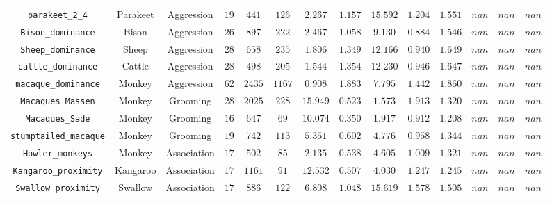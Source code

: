 \documentclass[10pt]{article}
\begin{document}
\begin{landscape}
\begin{table}[t]
\begin{tabular}{c|ccccccccccccc}
\verb|parakeet_2_4| & Parakeet & Aggression & $19$ & $441$ & $126$ & $2.267$ & $1.157$ & $15.592$ & $1.204$ & $1.551$ & $nan$ & $nan$ & $nan$\\
\verb|Bison_dominance| & Bison & Aggression & $26$ & $897$ & $222$ & $2.467$ & $1.058$ & $9.130$ & $0.884$ & $1.546$ & $nan$ & $nan$ & $nan$\\
\verb|Sheep_dominance| & Sheep & Aggression & $28$ & $658$ & $235$ & $1.806$ & $1.349$ & $12.166$ & $0.940$ & $1.649$ & $nan$ & $nan$ & $nan$\\
\verb|cattle_dominance| & Cattle & Aggression & $28$ & $498$ & $205$ & $1.544$ & $1.354$ & $12.230$ & $0.946$ & $1.647$ & $nan$ & $nan$ & $nan$\\
\verb|macaque_dominance| & Monkey & Aggression & $62$ & $2435$ & $1167$ & $0.908$ & $1.883$ & $7.795$ & $1.442$ & $1.860$ & $nan$ & $nan$ & $nan$\\
\verb|Macaques_Massen| & Monkey & Grooming & $28$ & $2025$ & $228$ & $15.949$ & $0.523$ & $1.573$ & $1.913$ & $1.320$ & $nan$ & $nan$ & $nan$\\
\verb|Macaques_Sade| & Monkey & Grooming & $16$ & $647$ & $69$ & $10.074$ & $0.350$ & $1.917$ & $0.912$ & $1.208$ & $nan$ & $nan$ & $nan$\\
\verb|stumptailed_macaque| & Monkey & Grooming & $19$ & $742$ & $113$ & $5.351$ & $0.602$ & $4.776$ & $0.958$ & $1.344$ & $nan$ & $nan$ & $nan$\\
\verb|Howler_monkeys| & Monkey & Association & $17$ & $502$ & $85$ & $2.135$ & $0.538$ & $4.605$ & $1.009$ & $1.321$ & $nan$ & $nan$ & $nan$\\
\verb|Kangaroo_proximity| & Kangaroo & Association & $17$ & $1161$ & $91$ & $12.532$ & $0.507$ & $4.030$ & $1.247$ & $1.245$ & $nan$ & $nan$ & $nan$\\
\verb|Swallow_proximity| & Swallow & Association & $17$ & $886$ & $122$ & $6.808$ & $1.048$ & $15.619$ & $1.578$ & $1.505$ & $nan$ & $nan$ & $nan$\\
\bottomrule
\end{tabular}
\end{table}

\end{landscape}

\small


\normalsize
\end{document}
